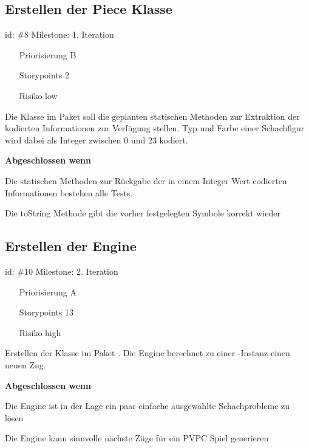 \subsection*{Erstellen der Piece Klasse}
id: \#8 Milestone: 1. Iteration\\

\begin{itemize}
\item[Priorisierung] B
\item[Storypoints] 2
\item[Risiko] low
\end{itemize}

Die Klasse im Paket  soll die geplanten statischen Methoden zur Extraktion der kodierten Informationen zur Verfügung stellen. Typ und Farbe einer Schachfigur wird dabei als Integer zwischen 0 und 23 kodiert.

\textbf{Abgeschlossen wenn}
\begin{todolist}
    \item[\done]  Die statischen Methoden zur Rückgabe der in einem Integer Wert codierten Informationen bestehen alle Tests.
  \item[\done]  Die toString Methode gibt die vorher festgelegten Symbole korrekt wieder

\end{todolist}


\subsection*{Erstellen der Engine}
id: \#10 Milestone: 2. Iteration\\

\begin{itemize}
\item[Priorisierung] A
\item[Storypoints] 13
\item[Risiko] high
\end{itemize}

Erstellen der Klasse  im Paket . Die Engine berechnet zu einer -Instanz einen neuen Zug.

\textbf{Abgeschlossen wenn}
\begin{todolist}
    \item  Die Engine ist in der Lage ein paar einfache ausgewählte Schachprobleme zu lösen
  \item  Die Engine kann sinnvolle nächste Züge für ein PVPC Spiel generieren

\end{todolist}


